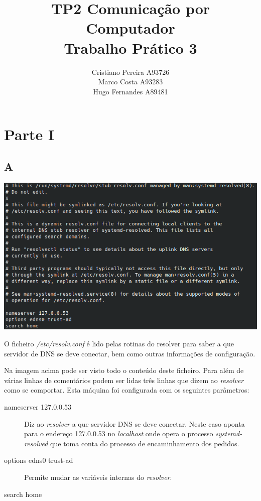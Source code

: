\documentclass{report}
\title{TP2}
\title{
    Comunicação por Computador \\
    \large{Trabalho Prático 3}
}
\author{
    Cristiano Pereira A93726 \\
    Marco Costa A93283 \\
    Hugo Fernandes A89481
}
\affil{
    Universidade do Minho \\
    Departamento de Informática
}
\begin{document}
    \maketitle
    \newpage

    \section*{Parte I}
        \subsection*{A}
            \noindent
            \includegraphics[width=\textwidth]{images/resolv.conf.png}
            \par
                O ficheiro \textit{/etc/resolv.conf} é lido pelas rotinas do resolver para saber
            a que servidor de DNS se deve conectar, bem como outras informações de configuração.\par 
                Na imagem acima pode ser visto todo o conteúdo deste ficheiro. Para além de várias linhas de comentários
            podem ser lidas três linhas que dizem ao \textit{resolver} como se comportar. Esta máquina foi configurada com os seguintes parâmetros: 
            \begin{description}
                \item[nameserver 127.0.0.53] Diz ao \textit{resolver} a que servidor DNS se deve conectar. Neste caso aponta para o endereço 127.0.0.53 no
                \textit{localhost} onde opera o processo \textit{systemd-resolved} que toma conta do processo de encaminhamento dos pedidos.
                \item[options edns0 trust-ad] Permite mudar as variáveis internas do \textit{resolver}.
                \item[search home]   
            \end{description}
        \pagebreak
\end{document}
